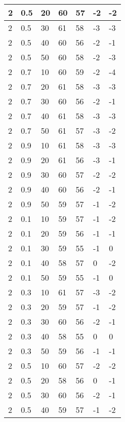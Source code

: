\begin{longtable}{|l|l|l|l|l|l|l|}
		2     & 0.5 & 20   & 60 & 57 & -2  & -2  \\ \hline
		2     & 0.5 & 30   & 61 & 58 & -3  & -3  \\ \hline
		2     & 0.5 & 40   & 60 & 56 & -2  & -1  \\ \hline
		2     & 0.5 & 50   & 60 & 58 & -2  & -3  \\ \hline
		2     & 0.7 & 10   & 60 & 59 & -2  & -4  \\ \hline
		2     & 0.7 & 20   & 61 & 58 & -3  & -3  \\ \hline
		2     & 0.7 & 30   & 60 & 56 & -2  & -1  \\ \hline
		2     & 0.7 & 40   & 61 & 58 & -3  & -3  \\ \hline
		2     & 0.7 & 50   & 61 & 57 & -3  & -2  \\ \hline
		2     & 0.9 & 10   & 61 & 58 & -3  & -3  \\ \hline
		2     & 0.9 & 20   & 61 & 56 & -3  & -1  \\ \hline
		2     & 0.9 & 30   & 60 & 57 & -2  & -2  \\ \hline
		2     & 0.9 & 40   & 60 & 56 & -2  & -1  \\ \hline
		2     & 0.9 & 50   & 59 & 57 & -1  & -2  \\ \hline
		2     & 0.1 & 10   & 59 & 57 & -1  & -2  \\ \hline
		2     & 0.1 & 20   & 59 & 56 & -1  & -1  \\ \hline
		2     & 0.1 & 30   & 59 & 55 & -1  & 0   \\ \hline
		2     & 0.1 & 40   & 58 & 57 & 0   & -2  \\ \hline
		2     & 0.1 & 50   & 59 & 55 & -1  & 0   \\ \hline
		2     & 0.3 & 10   & 61 & 57 & -3  & -2  \\ \hline
		2     & 0.3 & 20   & 59 & 57 & -1  & -2  \\ \hline
		2     & 0.3 & 30   & 60 & 56 & -2  & -1  \\ \hline
		2     & 0.3 & 40   & 58 & 55 & 0   & 0   \\ \hline
		2     & 0.3 & 50   & 59 & 56 & -1  & -1  \\ \hline
		2     & 0.5 & 10   & 60 & 57 & -2  & -2  \\ \hline
		2     & 0.5 & 20   & 58 & 56 & 0   & -1  \\ \hline
		2     & 0.5 & 30   & 60 & 56 & -2  & -1  \\ \hline
		2     & 0.5 & 40   & 59 & 57 & -1  & -2  \\ \hline

\end{longtable}
